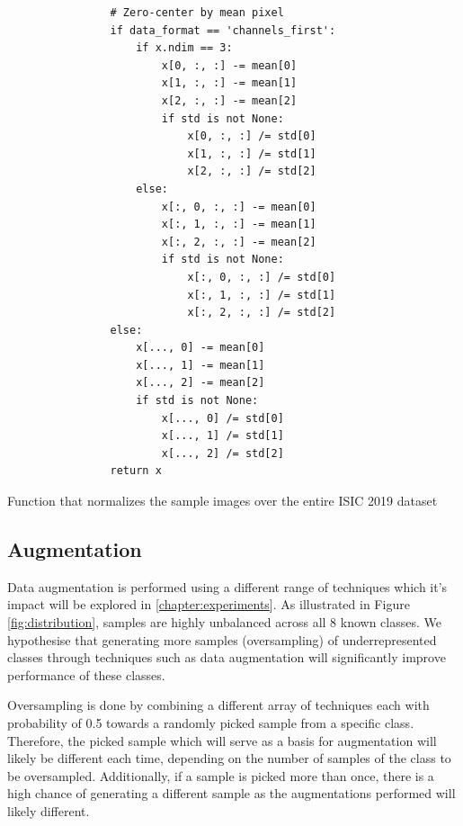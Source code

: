 \begin{enumerate}
\begin{listing}[ht]
\begin{verbatim}
                # Zero-center by mean pixel
                if data_format == 'channels_first':
                    if x.ndim == 3:
                        x[0, :, :] -= mean[0]
                        x[1, :, :] -= mean[1]
                        x[2, :, :] -= mean[2]
                        if std is not None:
                            x[0, :, :] /= std[0]
                            x[1, :, :] /= std[1]
                            x[2, :, :] /= std[2]
                    else:
                        x[:, 0, :, :] -= mean[0]
                        x[:, 1, :, :] -= mean[1]
                        x[:, 2, :, :] -= mean[2]
                        if std is not None:
                            x[:, 0, :, :] /= std[0]
                            x[:, 1, :, :] /= std[1]
                            x[:, 2, :, :] /= std[2]
                else:
                    x[..., 0] -= mean[0]
                    x[..., 1] -= mean[1]
                    x[..., 2] -= mean[2]
                    if std is not None:
                        x[..., 0] /= std[0]
                        x[..., 1] /= std[1]
                        x[..., 2] /= std[2]
                return x
        \end{verbatim}
        \caption{Function that normalizes the sample images over the entire ISIC 2019 dataset}
        \label{code:correct}
        \end{listing}
    \end{enumerate}


\subsection{Augmentation}
\label{subsection:augmentation}
    
    Data augmentation is performed using a different range of techniques which it's impact will be explored in \autoref{chapter:experiments}. As illustrated in Figure \ref{fig:distribution}, samples are highly unbalanced across all 8 known classes. We hypothesise that generating more samples (oversampling) of underrepresented classes through techniques such as data augmentation will significantly improve performance of these classes. \par 
    
    Oversampling is done by combining a different array of techniques each with probability of 0.5 towards a randomly picked sample from a specific class. Therefore, the picked sample which will serve as a basis for augmentation will likely be different each time, depending on the number of samples of the class to be oversampled. Additionally, if a sample is picked more than once, there is a high chance of generating a different sample as the augmentations performed will likely different. \par
    
